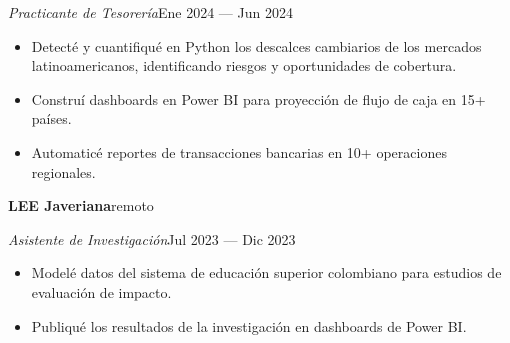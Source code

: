 \documentclass[a4paper,10pt]{article}
\newcommand{\headline}[2]{\needspace{3\baselineskip}\textbf{\color{ink}#1}\hfill{\small #2}\par}
\newcommand{\subline}[2]{\textit{#1}\hfill{\small #2}\par}
\begin{document}
\subline{Practicante de Tesorería}{Ene 2024 --- Jun 2024}
\begin{itemize}[leftmargin=1.1em, itemsep=0pt, topsep=1pt, parsep=0pt]
  \item Detecté y cuantifiqué en Python los descalces cambiarios de los mercados latinoamericanos, identificando riesgos y oportunidades de cobertura.
  \item Construí dashboards en Power BI para proyección de flujo de caja en 15+ países.
  \item Automaticé reportes de transacciones bancarias en 10+ operaciones regionales.
\end{itemize}
\vspace{4pt}
\headline{LEE Javeriana}{remoto}
\vspace{1pt}
\subline{Asistente de Investigación}{Jul 2023 --- Dic 2023}
\begin{itemize}[leftmargin=1.1em, itemsep=0pt, topsep=1pt, parsep=0pt]
  \item Modelé datos del sistema de educación superior colombiano para estudios de evaluación de impacto.
  \item Publiqué los resultados de la investigación en dashboards de Power BI.
\end{itemize}
\vspace{4pt}
\end{document}
